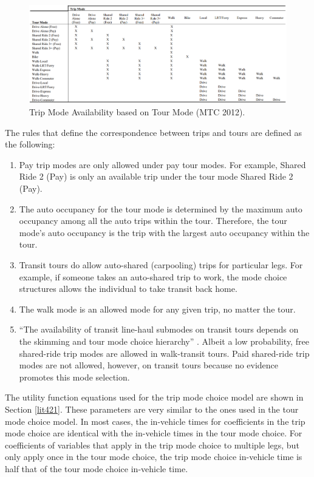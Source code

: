 \documentclass[3p, authoryear, review]{elsarticle} %
\begin{document}
\begin{figure}

{\centering \includegraphics[width=1\linewidth]{pics/trip_allow} 

}

\caption{Trip Mode Availability based on Tour Mode (MTC 2012).}\label{fig:fig2}
\end{figure}

The rules that define the correspondence between trips and tours are defined as the following: \citep{mtc12}

\begin{enumerate}
\def\labelenumi{\arabic{enumi}.}
\item
  Pay trip modes are only allowed under pay tour modes. For example, Shared Ride 2 (Pay) is only an available trip under the tour mode Shared Ride 2 (Pay).
\item
  The auto occupancy for the tour mode is determined by the maximum auto occupancy among all the auto trips within the tour. Therefore, the tour mode's auto occupancy is the trip with the largest auto occupancy within the tour.
\item
  Transit tours do allow auto-shared (carpooling) trips for particular legs. For example, if someone takes an auto-shared trip to work, the mode choice structures allows the individual to take transit back home.
\item
  The walk mode is an allowed mode for any given trip, no matter the tour.
\item
  ``The availability of transit line-haul submodes on transit tours depends on the skimming and tour mode choice hierarchy'' \citep{mtc12}. Albeit a low probability, free shared-ride trip modes are allowed in walk-transit tours. Paid shared-ride trip modes are not allowed, however, on transit tours because no evidence promotes this mode selection.
\end{enumerate}

The utility function equations used for the trip mode choice model are shown in Section \ref{lit421}. These parameters are very similar to the ones used in the tour mode choice model. In most cases, the in-vehicle times for coefficients in the trip mode choice are identical with the in-vehicle times in the tour mode choice. For coefficients of variables that apply in the trip mode choice to multiple legs, but only apply once in the tour mode choice, the trip mode choice in-vehicle time is half that of the tour mode choice in-vehicle time.
\end{document}
